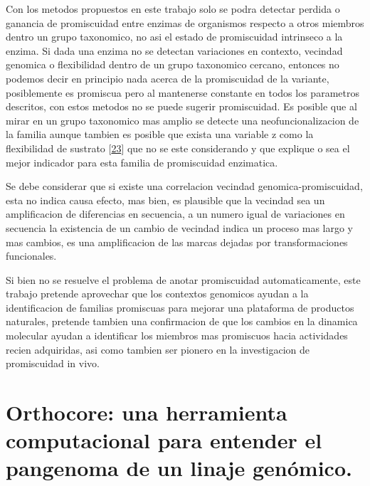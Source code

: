 \documentclass[12pt,twoside]{reedthesis}
\begin{document}
  Con los metodos propuestos en este trabajo solo se podra detectar
  perdida o ganancia de promiscuidad entre enzimas de organismos respecto
  a otros miembros dentro un grupo taxonomico, no asi el estado de
  promiscuidad intrinseco a la enzima. Si dada una enzima no se detectan
  variaciones en contexto, vecindad genomica o flexibilidad dentro de un
  grupo taxonomico cercano, entonces no podemos decir en principio nada
  acerca de la promiscuidad de la variante, posiblemente es promiscua pero
  al mantenerse constante en todos los parametros descritos, con estos
  metodos no se puede sugerir promiscuidad. Es posible que al mirar en un
  grupo taxonomico mas amplio se detecte una neofuncionalizacion de la
  familia aunque tambien es posible que exista una variable z como la
  flexibilidad de sustrato
  {[}\protect\hyperlink{ref-nobeli_protein_2009}{23}{]} que no se este
  considerando y que explique o sea el mejor indicador para esta familia
  de promiscuidad enzimatica.
  
  Se debe considerar que si existe una correlacion vecindad
  genomica-promiscuidad, esta no indica causa efecto, mas bien, es
  plausible que la vecindad sea un amplificacion de diferencias en
  secuencia, a un numero igual de variaciones en secuencia la existencia
  de un cambio de vecindad indica un proceso mas largo y mas cambios, es
  una amplificacion de las marcas dejadas por transformaciones
  funcionales.
  
  Si bien no se resuelve el problema de anotar promiscuidad
  automaticamente, este trabajo pretende aprovechar que los contextos
  genomicos ayudan a la identificacion de familias promiscuas para mejorar
  una plataforma de productos naturales, pretende tambien una confirmacion
  de que los cambios en la dinamica molecular ayudan a identificar los
  miembros mas promiscuos hacia actividades recien adquiridas, asi como
  tambien ser pionero en la investigacion de promiscuidad in vivo.
  
  \chapter{Orthocore: una herramienta computacional para entender el
  pangenoma de un linaje
  genómico.}\label{orthocore-una-herramienta-computacional-para-entender-el-pangenoma-de-un-linaje-genomico.}
  
\end{document}

